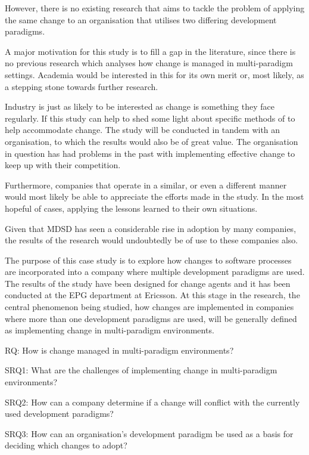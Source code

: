 \documentclass[10pt,twocolumn]{article}
\begin{document}
However, there is no existing research that aims to tackle the problem of applying the same change to an organisation that utilises two differing development paradigms.

A major motivation for this study is to fill a gap in the literature, since there is no previous research which analyses how change is managed in multi-paradigm settings. Academia would be interested in this for its own merit or, most likely, as a stepping stone towards further research.

Industry is just as likely to be interested as change is something they face regularly. If this study can help to shed some light about specific methods of to help accommodate change. The study will be conducted in tandem with an organisation, to which the results would also be of great value. The organisation in question has had problems in the past with implementing effective change to keep up with their competition. 

Furthermore, companies that operate in a similar, or even a different manner would most likely be able to appreciate the efforts made in the study. In the most hopeful of cases, applying the lessons learned to their own situations.

Given that MDSD has seen a considerable rise in adoption by many companies\cite{millermda}, the results of the research would undoubtedly be of use to these companies also.

The purpose of this case study is to explore how changes to software processes are incorporated into a company where multiple development paradigms are used. The results of the study have been designed for change agents and it has been conducted at the EPG department at Ericsson. At this stage in the research, the central phenomenon being studied, how changes are implemented in companies where more than one development paradigms are used, will be generally defined as implementing change in multi-paradigm environments. 


RQ: How is change managed in multi-paradigm environments?

SRQ1: What are the challenges of implementing change in multi-paradigm environments?

SRQ2: How can a company determine if a change will conflict with the currently used development paradigms?

SRQ3: How can an organisation's development paradigm be used as a basis for deciding which changes to adopt?
\end{document}
